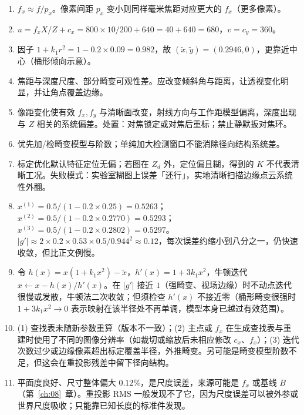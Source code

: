 \begin{enumerate}
  \item $f_x\approx f/p_x$。像素间距 $p_x$ 变小则同样毫米焦距对应更大的 $f_x$（更多像素）。
  \item $u=f_x X/Z+c_x=800\times10/200+640=40+640=680$，$v=c_y=360$。
  \item 因子 $1+k_1 r^2=1-0.2\times0.09=0.982$，故 $(\tilde{x},\tilde{y})=(0.2946,0)$，更靠近中心（桶形倾向示意）。
  \item 焦距与深度尺度、部分畸变可观性差。应改变倾斜角与距离，让透视变化明显，并让角点覆盖边缘。
  \item 像距变化使有效 $f_x,f_y$ 与清晰面改变，射线方向与工作距模型偏离，深度出现与 $Z$ 相关的系统偏差。处置：对焦锁定或对焦后重标；禁止静默扳对焦环。
  \item 优先加/检畸变模型与阶数；单纯加大检测窗口不能消除径向结构系统差。
  \item 标定优化默认特征定位无偏；若图在 $Z_d$ 外，定位偏且糊，得到的 $K$ 不代表清晰工况。失败模式：实验室糊图上误差「还行」，实地清晰扫描边缘点云系统性外翻。
  \item $x^{(1)}=0.5/(1-0.2\times0.25)=0.5263$；$x^{(2)}=0.5/(1-0.2\times0.2770)=0.5293$；$x^{(3)}=0.5/(1-0.2\times0.2802)=0.5297$。$|g'|\approx2\times0.2\times0.53\times0.5/0.944^2\approx0.12$，每次误差约缩小到八分之一，仍快速收敛，但比正文例慢。
  \item 令 $h(x)=x(1+k_1x^2)-\tilde{x}$，$h'(x)=1+3k_1x^2$，牛顿迭代 $x\leftarrow x-h(x)/h'(x)$。在 $|g'|$ 接近 $1$（强畸变、视场边缘）时不动点迭代很慢或发散，牛顿法二次收敛；但须检查 $h'(x)$ 不接近零（桶形畸变很强时 $1+3k_1x^2\to0$ 表示映射在该半径处不再单调，模型本身已越过有效范围）。
  \item (1) 查找表未随新参数重算（版本不一致）；(2) 主点或 $f_x$ 在生成查找表与重建时使用了不同的图像分辨率（如裁切或缩放后未相应修改 $c_x$、$f_x$）；(3) 迭代次数过少或边缘像素超出标定覆盖半径，外推畸变。另可能是畸变模型阶数不足，但这会在重投影残差中留下径向结构。
  \item 平面度良好、尺寸整体偏大 $0.12\%$，是尺度误差，来源可能是 $f_x$ 或基线 $B$（第~\ref{ch:08}~章）。重投影 RMS 一般发现不了它，因为尺度误差可以被外参或世界尺度吸收；只能靠已知长度的标准件发现。
\end{enumerate}
